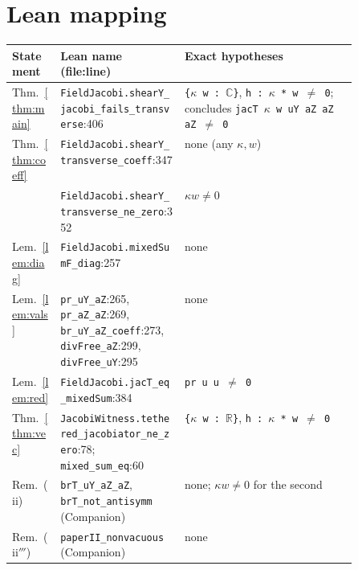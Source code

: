 \documentclass[11pt]{article}\emergencystretch=2em
\theoremstyle{definition}\newtheorem{definition}[theorem]{Definition}\theoremstyle{remark}\newtheorem{remark}[theorem]{Remark}
\begin{document}
\section{Lean mapping}
\small\let\oldus\_\renewcommand\_{\oldus\allowbreak}\begin{tabularx}{\linewidth}{@{}>{\raggedright}p{0.14\linewidth}>{\raggedright}p{0.36\linewidth}>{\raggedright\arraybackslash}X@{}}\toprule
Statement & Lean name (file:line) & Exact hypotheses\\\midrule
Thm.~\ref{thm:main} & \texttt{FieldJacobi.shearY\_jacobi\_fails\_transverse}:406 & \texttt{\{$\kappa$ w : $\mathbb{C}$\}}, \texttt{h : $\kappa$ * w $\ne$ 0}; concludes \texttt{jacT $\kappa$ w uY aZ aZ aZ $\ne$ 0}\\
Thm.~\ref{thm:coeff} & \texttt{FieldJacobi.shearY\_transverse\_coeff}:347 & none (any $\kappa,w$)\\
& \texttt{FieldJacobi.shearY\_transverse\_ne\_zero}:352 & $\kappa w\ne0$\\
Lem.~\ref{lem:diag} & \texttt{FieldJacobi.mixedSumF\_diag}:257 & none\\
Lem.~\ref{lem:vals} & \texttt{pr\_uY\_aZ}:265, \texttt{pr\_aZ\_aZ}:269, \texttt{br\_uY\_aZ\_coeff}:273, \texttt{divFree\_aZ}:299, \texttt{divFree\_uY}:295 & none\\
Lem.~\ref{lem:red} & \texttt{FieldJacobi.jacT\_eq\_mixedSum}:384 & \texttt{pr u u $\ne$ 0}\\
Thm.~\ref{thm:vec} & \texttt{JacobiWitness.tethered\_jacobiator\_ne\_zero}:78; \texttt{mixed\_sum\_eq}:60 & \texttt{\{$\kappa$ w : $\mathbb{R}$\}}, \texttt{h : $\kappa$ * w $\ne$ 0}\\
Rem.\ (ii) & \texttt{brT\_uY\_aZ\_aZ}, \texttt{brT\_not\_antisymm} (Companion) & none; $\kappa w\ne0$ for the second\\
Rem.\ (ii$'''$) & \texttt{paperII\_nonvacuous} (Companion) & none\\
\bottomrule\end{tabularx}\normalsize
\end{document}

